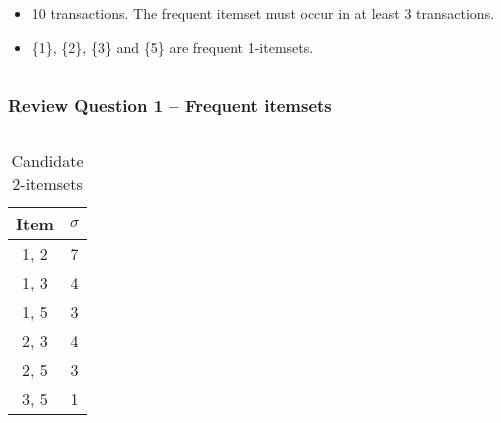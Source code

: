 \documentclass[aspectratio=169, 10pt]{beamer}
\begin{document}
\begin{frame}[t]
\begin{columns}
\begin{column}{0.5\textwidth}
        \begin{itemize}
            \item 10 transactions. The frequent itemset must occur in at least 3 transactions.
            \item \{1\}, \{2\}, \{3\} and \{5\} are frequent 1-itemsets.
        \end{itemize}
    \end{column}
\end{columns}

\end{frame}

\begin{frame}[t]
\frametitle{Review Question 1 -- Frequent itemsets}
\small

\begin{columns}
    \begin{column}{0.5\textwidth} 
        \begin{table}[]
            \begin{tabular}{c|c}
                Item                       &  $\sigma$                \\ \hline
                1, 2                       & 7                        \\
                1, 3                       & 4                        \\
                1, 5                       & 3                        \\
                2, 3                       & 4                        \\
                2, 5                       & 3                        \\
                {\color[HTML]{FE0000} 3, 5} & {\color[HTML]{FE0000} 1}
            \end{tabular}
            \caption{Candidate 2-itemsets}
        \end{table}


\end{column}
\end{columns}
\end{frame}
\end{document}
